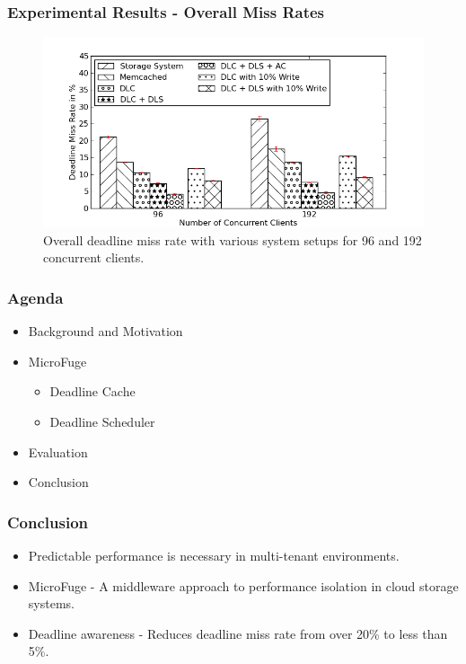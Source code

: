 \documentclass{beamer}
\begin{document}
\begin{frame}
  \frametitle{Experimental Results - Overall Miss Rates}
  \begin{figure}[t]
    \begin{center}
      \centerline{\includegraphics[scale=0.5]{img/EC2/EC2_BAR/miss_bar.png}}
      \caption{Overall deadline miss rate with various system setups for
        96 and 192 concurrent clients.}
      \label{fig:bar_miss}
    \end{center}
  \end{figure}
\end{frame}




\begin{frame}
  \frametitle{Agenda}
  \begin{itemize}
  \item[\Checkmark] Background and Motivation
  \item[\Checkmark] MicroFuge
    \begin{itemize}
    \item[\Checkmark] Deadline Cache
    \item[\Checkmark] Deadline Scheduler
    \end{itemize}
  \item[\Checkmark] Evaluation
  \item Conclusion
  \end{itemize}
\end{frame}





\begin{frame}
  \frametitle{Conclusion}
  \begin{itemize}
  \item Predictable performance is necessary in multi-tenant environments.
  \item MicroFuge - A middleware approach to performance isolation in cloud
    storage systems.
  \item Deadline awareness - Reduces deadline miss rate from over 20\% to
    less than 5\%.
  \end{itemize}
\end{frame}
\end{document}
